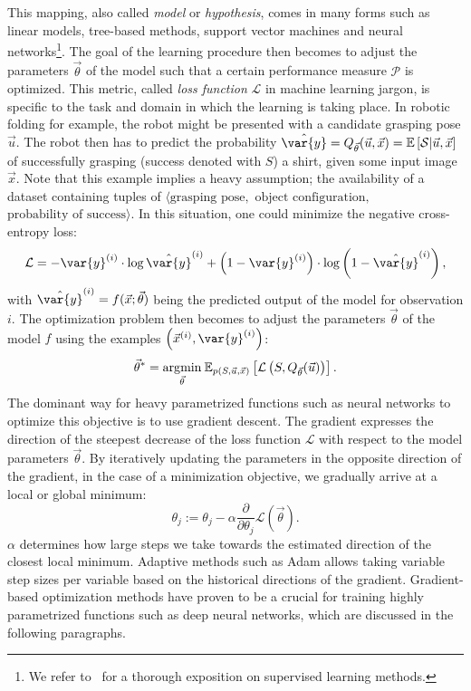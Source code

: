 \documentclass[\home/main.tex]{subfiles}
\begin{document}
This mapping, also called \textit{model} or \textit{hypothesis}, comes in many forms such as linear models, tree-based methods, support vector machines and neural networks\footnote{We refer to~\textcite{Murphy2012, Bishop2006, Hastie2001} for a thorough exposition on supervised learning methods.}.
The goal of the learning procedure then becomes to adjust the parameters $\vec{\theta}$ of the model such that a certain performance measure $\mathcal{P}$ is optimized. This metric, called \textit{loss function} $\mathcal{L}$ in machine learning jargon, is specific to the task and domain in which the learning is taking place. In robotic folding for example, the robot might be presented with a candidate grasping pose $\vec{u}$. The robot then has to predict the probability $\hat{\var{y}} = Q_{\vec{\theta}}(\vec{u}, \vec{x}) = \mathbb{E}\left[ \mathcal{S} | \vec{u}, \vec{x} \right]$ of successfully grasping (success denoted with $S$) a shirt, given some input image $\vec{x}$. Note that this example implies a heavy assumption; the availability of a dataset containing tuples of $ \langle\text{grasping pose}, $ $\text{object configuration},$ $\text{probability of success} \rangle$.
In this situation, one could minimize the negative cross-entropy loss:
\begin{equation*}
	\mathcal{L}=-\var{y}^{(i)} \cdot \log \hat{\var{y}}^{(i)} +\left(1-\var{y}^{(i)}\right) \cdot \log \left(1-\hat{\var{y}}^{(i)}\right),
\end{equation*} with $\hat{\var{y}}^{(i)} = f(\vec{x};\vec{\theta})$ being the predicted output of the model for observation $i$.
The optimization problem then becomes to adjust the parameters $\vec{\theta}$ of the model $f$ using the examples $\left(\vec{x}^{(i)}, \var{y}^{(i)}\right)$:
\begin{equation*}
	\vec{\theta}^{*}=\underset{\vec{\theta}}{\operatorname*{\arg\!\min}} \: \mathbb{E}_{p(S, \vec{u}, \vec{x})}\left[\mathcal{L}\left(S, Q_{\vec{\theta}}(\vec{u})\right)\right].
\end{equation*}
The dominant way for heavy parametrized functions such as neural networks to optimize this objective is to use gradient descent. The gradient expresses the direction of the steepest decrease of the loss function $\mathcal{L}$ with respect to the model parameters $\vec{\theta}$. By iteratively updating the parameters in the opposite direction of the gradient, in the case of a minimization objective, we gradually arrive at a local or global minimum:
\begin{equation*}
	\theta_{j}:=\theta_{j}-\alpha \frac{\partial}{\partial \theta_{j}} \mathcal{L}(\vec{\theta}).
\end{equation*}
$\alpha$ determines how large steps we take towards the estimated direction of the closest local minimum. Adaptive methods such as Adam \autocite{Kingma2014} allows taking variable step sizes per variable based on the historical directions of the gradient. Gradient-based optimization methods have proven to be a crucial for training highly parametrized functions such as deep neural networks, which are discussed in the following paragraphs. 
\end{document}
